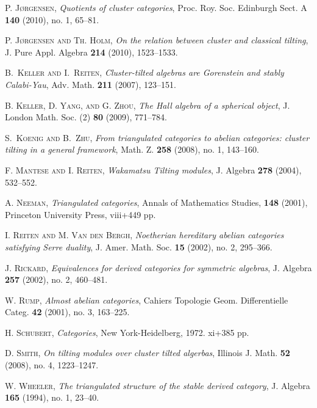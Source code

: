 \documentclass[oneside, a4paper,reqno]{amsart}
\numberwithin{equation}{section}
\theoremstyle{definition}
\begin{document}
\begin{thebibliography}{99}
\textsc{P. J{\o}rgensen}, {\em Quotients of cluster categories},  Proc. Roy. Soc. Edinburgh Sect. A {\bf 140} (2010), no. 1, 65--81. 

\textsc{P. J{\o}rgensen and Th. Holm}, {\em On the relation between cluster and classical tilting},  J. Pure Appl. Algebra {\bf 214} (2010), 1523--1533. 

\textsc{B.~Keller and I.~Reiten}, \textit{Cluster-tilted algebras are Gorenstein and stably Calabi-Yau},
Adv. Math. {\bf 211} (2007), 123--151.

\textsc{B. Keller, D. Yang, and G. Zhou}, {\em The Hall algebra of a spherical object}, J. London Math. Soc.  (2) {\bf 80} (2009),  771--784.  

\textsc{S.~Koenig and B.~Zhu}, {\em  From triangulated categories to
abelian categories: cluster tilting in a general framework},  Math.
Z. {\bf 258}  (2008),  no. 1, 143--160.

\textsc{F. Mantese and I. Reiten}, {\em Wakamatsu Tilting modules}, J. Algebra {\bf 278} (2004), 532--552.

\textsc{A. Neeman}, {\em Triangulated categories},  
Annals of Mathematics Studies, {\bf 148} (2001), Princeton University Press, viii+449 pp.

\textsc{I. Reiten and M. Van den Bergh}, {\em Noetherian hereditary abelian categories satisfying Serre duality},  J. Amer. Math. Soc. {\bf 15} (2002), no. 2, 295--366. 

\textsc{J. Rickard}, \textit{Equivalences for derived categories  for symmetric algebras}, J. Algebra {\bf 257} (2002), no. 2, 460--481.

\textsc{W. Rump}, \textit{Almost abelian categories}, Cahiers Topologie Geom. Differentielle Categ. {\bf 42}
(2001), no. 3, 163--225.

\textsc{H. Schubert}, {\em Categories}, New York-Heidelberg, 1972. xi+385 pp. 

\textsc{D. Smith}, {\em On tilting modules over cluster tilted algerbas}, Illinois J. Math. {\bf 52} (2008), no. 4, 1223--1247. 

\textsc{W. Wheeler}, {\em The triangulated structure of the stable derived category}, 
J. Algebra {\bf 165} (1994), no. 1, 23--40. 

\end{thebibliography}
\end{document}
